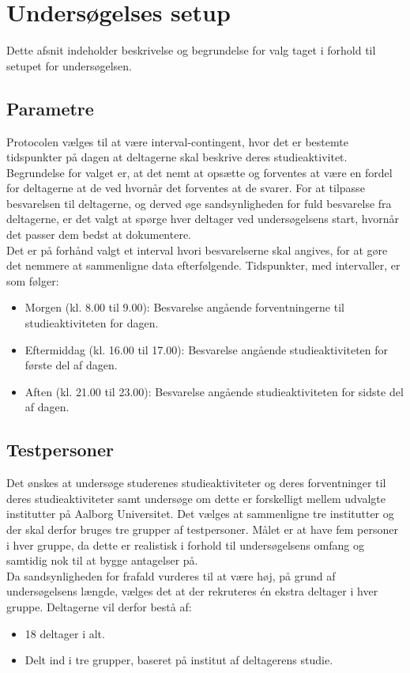\chapter*{Undersøgelses setup}
Dette afsnit indeholder beskrivelse og begrundelse for valg taget i forhold til setupet for undersøgelsen.  
\section*{Parametre}
Protocolen vælges til at være interval-contingent, hvor det er bestemte tidspunkter på dagen at deltagerne skal beskrive deres studieaktivitet. Begrundelse for valget er, at det nemt at opsætte og forventes at være en fordel for deltagerne at de ved hvornår det forventes at de svarer. For at tilpasse besvarelsen til deltagerne, og derved øge sandsynligheden for fuld besvarelse fra deltagerne, er det valgt at spørge hver deltager ved undersøgelsens start, hvornår det passer dem bedst at dokumentere. \\
Det er på forhånd valgt et interval hvori besvarelserne skal angives, for at gøre det nemmere at sammenligne data efterfølgende. Tidspunkter, med intervaller, er som følger: 
\begin{itemize}
	\item Morgen (kl. 8.00 til 9.00): Besvarelse angående forventningerne til studieaktiviteten for dagen. 
	\item Eftermiddag (kl. 16.00 til 17.00): Besvarelse angående studieaktiviteten for første del af dagen. 
	\item Aften (kl. 21.00 til 23.00): Besvarelse angående studieaktiviteten for sidste del af dagen.
\end{itemize}

\section*{Testpersoner}
Det ønskes at undersøge studerenes studieaktiviteter og deres forventninger til deres studieaktiviteter samt undersøge om dette er forskelligt mellem udvalgte institutter på Aalborg Universitet. Det vælges at sammenligne tre institutter og der skal derfor bruges tre grupper af testpersoner. Målet er at have fem personer i hver gruppe, da dette er realistisk i forhold til undersøgelsens omfang og samtidig nok til at bygge antagelser på. \\
Da sandsynligheden for frafald vurderes til at være høj, på grund af undersøgelsens længde, vælges det at der rekruteres én ekstra deltager i hver gruppe. Deltagerne vil derfor bestå af:
\begin{itemize} 
	\item 18 deltager i alt. 
	\item Delt ind i tre grupper, baseret på institut af deltagerens studie. 
\end{itemize}
